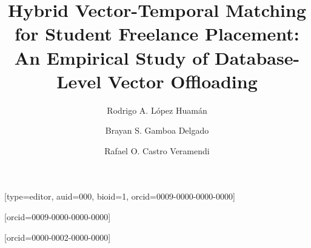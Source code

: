\documentclass[a4paper,fleqn]{cas-dc}
\begin{document}
\let\WriteBookmarks\relax
\def\floatpagepagefraction{1}
\def\textpagefraction{.001}


\title [mode = title]{Hybrid Vector-Temporal Matching for Student Freelance Placement: An Empirical Study of Database-Level Vector Offloading}

\author[1]{Rodrigo A. L{\'o}pez Huam{\'a}n}[type=editor, auid=000, bioid=1, orcid=0009-0000-0000-0000]
\cormark[1]

\author[1]{Brayan S. Gamboa Delgado}[orcid=0009-0000-0000-0000]

\author[1]{Rafael O. Castro Veramendi}[orcid=0000-0002-0000-0000]

\address[1]{Facultad de Ingenier{\'i}a, Universidad Peruana de Ciencias Aplicadas (UPC), Prolongaci{\'o}n Primavera 2390, Lima, 15023, Per{\'u}}

\end{document}
